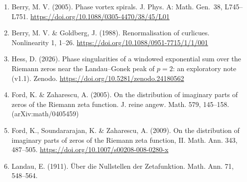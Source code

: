 \documentclass[
  10pt,
]{article}
\begin{document}
\begin{enumerate}
  singularities. J. Opt. A: Pure Appl. Opt. 6, S178--S180.
  \url{https://doi.org/10.1088/1464-4258/6/5/006}
\item
  Berry, M. V. (2005). Phase vortex spirals. J. Phys. A: Math. Gen.~38,
  L745--L751. \url{https://doi.org/10.1088/0305-4470/38/45/L01}
\item
  Berry, M. V. \& Goldberg, J. (1988). Renormalisation of curlicues.
  Nonlinearity 1, 1--26. \url{https://doi.org/10.1088/0951-7715/1/1/001}
\item
  Hess, D. (2026). Phase singularities of a windowed exponential sum
  over the Riemann zeros near the Landau--Gonek peak of \(p = 2\): an
  exploratory note (v1.1). Zenodo.
  \url{https://doi.org/10.5281/zenodo.24180562}
\item
  Ford, K. \& Zaharescu, A. (2005). On the distribution of imaginary
  parts of zeros of the Riemann zeta function. J. reine angew. Math.
  579, 145--158. (arXiv:math/0405459)
\item
  Ford, K., Soundararajan, K. \& Zaharescu, A. (2009). On the
  distribution of imaginary parts of zeros of the Riemann zeta function,
  II. Math. Ann. 343, 487--505.
  \url{https://doi.org/10.1007/s00208-008-0280-x}
\item
  Landau, E. (1911). Über die Nullstellen der Zetafunktion. Math. Ann.
  71, 548--564.
\end{enumerate}
\end{document}
